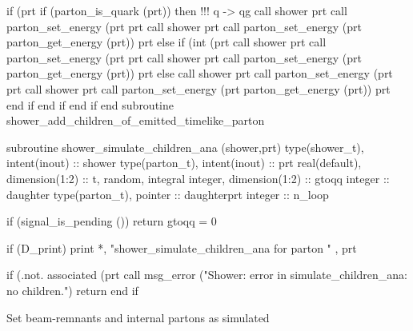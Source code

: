     if (prt%
       if (parton_is_quark (prt)) then
          !!! q -> qg
          call shower%
          prt%
          call parton_set_energy (prt%
          prt%
          call shower%
          prt%
          call parton_set_energy (prt%
               parton_get_energy (prt))
          prt%
       else
          if (int (prt%
             call shower%
             prt%
             call parton_set_energy (prt%
             prt%
             call shower%
             prt%
             call parton_set_energy (prt%
                  parton_get_energy (prt))
             prt%
          else
             call shower%
             prt%
             call parton_set_energy (prt%
             prt%
             call shower%
             prt%
             call parton_set_energy (prt%
                  parton_get_energy (prt))
             prt%
          end if
       end if
    end if
  end subroutine shower_add_children_of_emitted_timelike_parton

\eatline
\nwendcode{}\nwdocspar
\nwenddocs{}\plusendmoddef
  subroutine shower_simulate_children_ana (shower,prt)
    type(shower_t), intent(inout) :: shower
    type(parton_t), intent(inout) :: prt
    real(default), dimension(1:2) :: t, random, integral
    integer, dimension(1:2) :: gtoqq
    integer :: daughter
    type(parton_t), pointer :: daughterprt
    integer :: n_loop

    if (signal_is_pending ()) return
    gtoqq = 0

    if (D_print) print *, "shower_simulate_children_ana for parton " , prt%

    if (.not. associated (prt%
       call msg_error ("Shower: error in simulate_children_ana: no children.")
       return
    end if

    \LA{}Set beam-remnants and internal partons as simulated\RA{}

